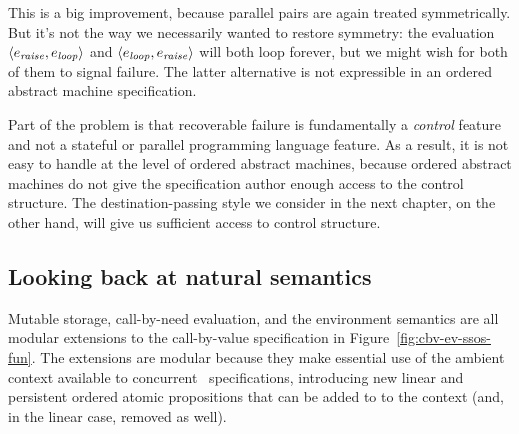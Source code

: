 
\noindent
This is a big improvement, because parallel pairs are again treated
symmetrically. But it's not the way we necessarily wanted to restore
symmetry: the evaluation $\langle e_{\it raise}, e_{\it loop} \rangle$
and $\langle e_{\it loop}, e_{\it raise} \rangle$ will both loop
forever, but we might wish for both of them to signal failure. The
latter alternative is not expressible in an ordered abstract machine
specification.

Part of the problem is that recoverable failure is fundamentally a
{\it control} feature and not a stateful or parallel programming
language feature. As a result, it is not easy to handle at the level
of ordered abstract machines, because ordered abstract machines do not
give the specification author enough access to the control
structure. The destination-passing style we consider in the next
chapter, on the other hand, 
will give us sufficient access to control structure.


\subsection{Looking back at natural semantics}
\label{sec:enriching-natsem}

Mutable storage, call-by-need evaluation, and the environment
semantics are all modular extensions to the call-by-value specification in
Figure~\ref{fig:cbv-ev-ssos-fun}.  The
extensions are modular because they make essential use of the ambient
context available to concurrent \sls~specifications, introducing new
linear and persistent ordered atomic propositions that can be added to
to the context (and, in the linear case, removed as well).

